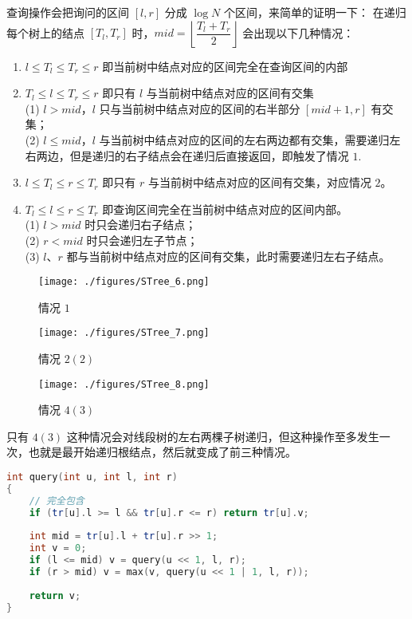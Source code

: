 查询操作会把询问的区间 $[l, r]$ 分成 $\log N$ 个区间，来简单的证明一下：
在递归每个树上的结点 $[T_l, T_r]$ 时，$mid = \left\lfloor\dfrac{T_l+T_r}{2}\right\rfloor$ 会出现以下几种情况：

\begin{enumerate}
\item $l \leq T_l \leq T_r \leq r$ 即当前树中结点对应的区间完全在查询区间的内部
\item $T_l \leq l \leq T_r \leq r$ 即只有 $l$ 与当前树中结点对应的区间有交集\\
      (1) $l > mid$，$l$ 只与当前树中结点对应的区间的右半部分 $[mid + 1, r]$ 有交集； \\
      (2) $l \leq mid$，$l$ 与当前树中结点对应的区间的左右两边都有交集，需要递归左右两边，但是递归的右子结点会在递归后直接返回，即触发了情况 $1$.\\
\item $l \leq T_l \leq r \leq T_r$ 即只有 $r$ 与当前树中结点对应的区间有交集，对应情况 $2$。
\item $T_l \leq l \leq r \leq T_r$ 即查询区间完全在当前树中结点对应的区间内部。\\
      (1) $l > mid$ 时只会递归右子结点； \\
      (2) $r < mid$ 时只会递归左子节点； \\
      (3) $l$、$r$ 都与当前树中结点对应的区间有交集，此时需要递归左右子结点。 \\

\end{enumerate}

\begin{figure}[ht]
\centering
\texttt{[image: ./figures/STree\_6.png]}
\caption{情况 $1$} \label{STree_fig6}
\end{figure}

\begin{figure}[ht]
\centering
\texttt{[image: ./figures/STree\_7.png]}
\caption{情况 $2(2)$} \label{STree_fig7}
\end{figure}

\begin{figure}[ht]
\centering
\texttt{[image: ./figures/STree\_8.png]}
\caption{情况 $4(3)$} \label{STree_fig8}
\end{figure}

只有 $4(3)$ 这种情况会对线段树的左右两棵子树递归，但这种操作至多发生一次，也就是最开始递归根结点，然后就变成了前三种情况。

\begin{lstlisting}[language=cpp]
int query(int u, int l, int r)
{
    // 完全包含
    if (tr[u].l >= l && tr[u].r <= r) return tr[u].v;  
    
    int mid = tr[u].l + tr[u].r >> 1;
    int v = 0;
    if (l <= mid) v = query(u << 1, l, r);
    if (r > mid) v = max(v, query(u << 1 | 1, l, r));
    
    return v;
}
\end{lstlisting}


